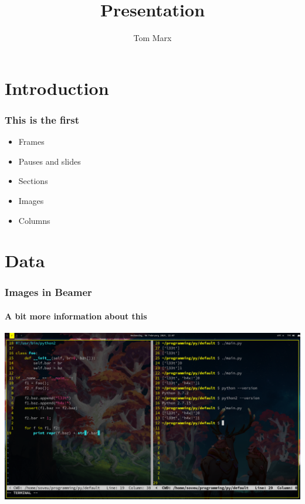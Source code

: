 \documentclass{beamer}
\title{Presentation}
\author{Tom Marx}
\begin{document}
\maketitle

\section{Introduction}

\begin{frame}
\frametitle{This is the first}
  \begin{itemize}
    \item Frames\pause
    \item Pauses and slides\pause
    \item Sections\pause
    \item Images
    \item Columns\pause
  \end{itemize}
\end{frame}

\section{Data}

\begin{frame}
  \frametitle{Images in Beamer}
  \framesubtitle{A bit more information about this}
  \includegraphics[width=\textwidth]{pybug23.png}
\end{frame}
\end{document}
